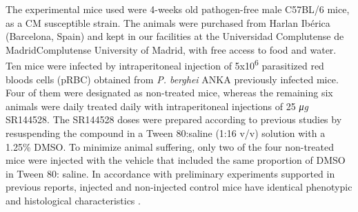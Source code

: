 \documentclass[empirical, authordate]{jote-new-article}
\begin{document}
The experimental mice used were 4-weeks old pathogen-free male C57BL/6 mice, as a CM susceptible strain. The animals were purchased from Harlan Ibérica (Barcelona, Spain) and kept in our facilities at the Universidad Complutense de MadridComplutense University of Madrid, with free access to food and water. Ten mice were infected by intraperitoneal injection of 5x10\textsuperscript{6} parasitized red bloods cells (pRBC) obtained from \emph{P. berghei}\emph{\textbf{ }}ANKA previously infected mice. Four of them were designated as non-treated mice, whereas the remaining six animals were daily treated daily with intraperitoneal injections of 25 \emph{μg} SR144528. The SR144528 doses were prepared according to previous studies \parencite{Alferink2016} by resuspending the compound in a Tween 80:saline (1:16 v/v) solution with a 1.25\% DMSO. To minimize animal suffering, only two of the four non-treated mice were injected with the vehicle that included the same proportion of DMSO in Tween 80: saline. In accordance with preliminary experiments supported in previous reports, injected and non-injected control mice have identical phenotypic and histological characteristics \parencite{Marín-García2009}.

\begin{figure}[th!]
  \begin{fullwidth}
    \caption{}
    \label{fig:1}
  \end{fullwidth}
\end{figure}
\end{document}
